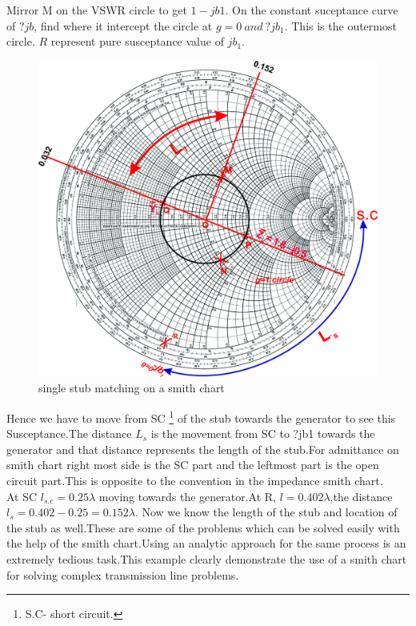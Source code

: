 \begin{example}
Mirror M on the VSWR circle to get $1-jb1$. On the constant suceptance curve of $?jb$, find where it intercept the circle at $g=0 \ and \ ?jb_1$. This is the outermost circle. $R$ represent pure susceptance value of $jb_1$. 
\begin{figure}[h]
\centering
\includegraphics[width=1\linewidth]{./graphics/fig14}
\caption{single stub matching on a smith chart}
\end{figure}

Hence we have to move from SC \footnote{S.C- short circuit.} of the stub towards the generator to see this Susceptance.The distance $L_s$ is the movement from SC to ?jb1 towards the generator and that distance represents the length of the stub.For admittance on smith chart right most side is the SC part and the leftmost  part is the open circuit part.This is  opposite to the convention in the impedance smith chart.\\
At SC $l_{s.c}=0.25\lambda$ moving towards the generator.At R, $l=0.402\lambda$,the distance $l_s=0.402-0.25=0.152\lambda$. Now we know the length of the stub and location of the stub as well.These are some of the problems which can be solved easily with the help of the smith chart.Using an analytic approach for the same  process is an extremely tedious task.This example clearly demonstrate the use of a smith  chart for solving complex transmission line problems.
\end{example}

